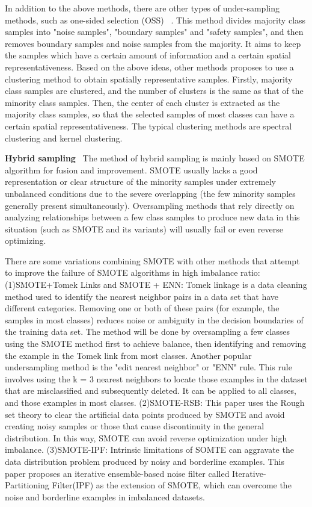 In addition to the above methods, there are other types of under-sampling methods, such as one-sided selection (OSS) ~\cite{ref_9}. This method divides majority class samples into "noise samples", "boundary samples" and "safety samples", and then removes boundary samples and noise samples from the majority. It aims to keep the samples which have a certain amount of information and a certain spatial representativeness. Based on the above ideas, other methods proposes to use a clustering method to obtain spatially representative samples. Firstly, majority class samples are clustered, and the number of clusters is the same as that of the minority class samples. Then, the center of each cluster is extracted as the majority class samples, so that the selected samples of most classes can have a certain spatial representativeness. The typical clustering methods are spectral clustering and kernel clustering.

\textbf{Hybrid sampling} \
The method of hybrid sampling is mainly based on SMOTE algorithm for fusion and improvement. SMOTE usually lacks a good representation or clear structure of the minority samples under extremely unbalanced conditions due to the severe overlapping (the few minority samples generally present simultaneously). Oversampling methods that rely directly on analyzing relationships between a few class samples to produce new data in this situation (such as SMOTE and its variants) will usually fail or even reverse optimizing.

There are some variations combining SMOTE with other methods that attempt to improve the failure of SMOTE algorithms in high imbalance ratio: (1)SMOTE+Tomek Links and SMOTE + ENN\cite{batista2004study}: Tomek linkage is a data cleaning method used to identify the nearest neighbor pairs in a data set that have different categories. Removing one or both of these pairs (for example, the samples in most classes) reduces noise or ambiguity in the decision boundaries of the training data set. The method will be done by oversampling a few classes using the SMOTE method first to achieve balance, then identifying and removing the example in the Tomek link from most classes. Another popular undersampling method is the "edit nearest neighbor" or "ENN" rule. This rule involves using the k = 3 nearest neighbors to locate those examples in the dataset that are misclassified and subsequently deleted. It can be applied to all classes, and those examples in most classes.
(2)SMOTE-RSB\cite{ramentol2012smote}: This paper uses the Rough set theory to clear the artificial data points produced by SMOTE and avoid creating noisy samples or those that cause discontinuity in the general distribution. In this way, SMOTE can avoid reverse optimization under high imbalance. (3)SMOTE-IPF\cite{saez2015smote}: Intrinsic limitations of SOMTE can aggravate the data distribution problem produced by noisy and borderline examples.
This paper proposes an iterative ensemble-based noise filter called Iterative-Partitioning Filter(IPF) as the extension of SMOTE, which can overcome the noise and borderline examples in imbalanced datasets.


